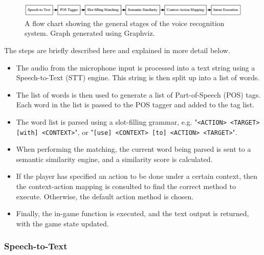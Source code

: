 \documentclass[11pt]{article}
\begin{document}
\begin{center}
\begin{figure}[H]
\begin{center}
  \includegraphics[width=\linewidth]{flow-chart.png}
  \caption{A flow chart showing the general stages of the voice recognition system. Graph generated using Graphviz.}
  \label{fig:flow-chart}
  \end{center}
\end{figure}
\end{center}

The steps are briefly described here and explained in more detail below.

\begin{itemize}
\item The audio from the microphone input is processed into a text string using a Speech-to-Text (STT) engine. This string is then split up into a list of words.

\item The list of words is then used to generate a list of Part-of-Speech (POS) tags. Each word in the list is passed to the POS tagger and added to the tag list.

\item The word list is parsed using a slot-filling grammar, e.g. "\texttt{<ACTION> <TARGET> [with] <CONTEXT>}", or "\texttt{[use] <CONTEXT> [to] <ACTION> <TARGET>}".

\item When performing the matching, the current word being parsed is sent to a semantic similarity engine, and a similarity score is calculated.

\item If the player has specified an action to be done under a certain context, then the context-action mapping is consulted to find the correct method to execute. Otherwise, the default action method is chosen.

\item Finally, the in-game function is executed, and the text output is returned, with the game state updated.
\end{itemize}

\subsubsection{Speech-to-Text}
\end{document}
